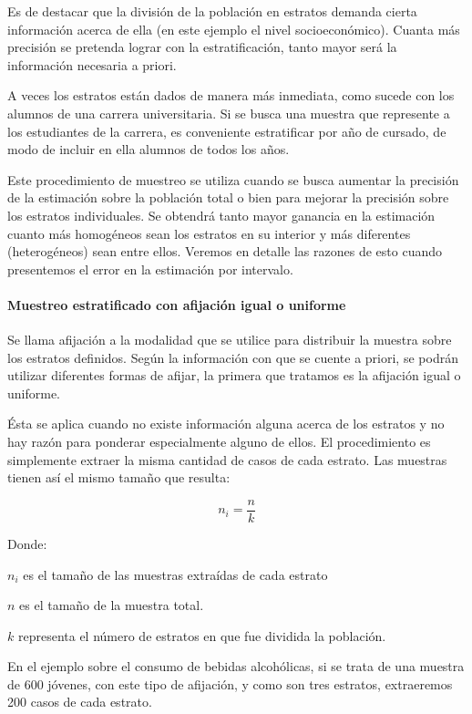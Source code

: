 \documentclass[]{article}
\let\oldparagraph\paragraph
\renewcommand{\paragraph}[1]{\oldparagraph{#1}\mbox{}}
\begin{document}
Es de destacar que la división de la población en estratos demanda
cierta información acerca de ella (en este ejemplo el nivel
socioeconómico). Cuanta más precisión se pretenda lograr con la
estratificación, tanto mayor será la información necesaria a priori.

A veces los estratos están dados de manera más inmediata, como sucede
con los alumnos de una carrera universitaria. Si se busca una muestra
que represente a los estudiantes de la carrera, es conveniente
estratificar por año de cursado, de modo de incluir en ella alumnos de
todos los años.

Este procedimiento de muestreo se utiliza cuando se busca aumentar la
precisión de la estimación sobre la población total o bien para mejorar
la precisión sobre los estratos individuales. Se obtendrá tanto mayor
ganancia en la estimación cuanto más homogéneos sean los estratos en su
interior y más diferentes (heterogéneos) sean entre ellos. Veremos en
detalle las razones de esto cuando presentemos el error en la estimación
por intervalo.

\hypertarget{muestreo-estratificado-con-afijacion-igual-o-uniforme}{%
\paragraph{Muestreo estratificado con afijación igual o uniforme}\label{muestreo-estratificado-con-afijacion-igual-o-uniforme}}

Se llama afijación a la modalidad que se utilice para distribuir la
muestra sobre los estratos definidos. Según la información con que se
cuente a priori, se podrán utilizar diferentes formas de afijar, la
primera que tratamos es la afijación igual o uniforme.

Ésta se aplica cuando no existe información alguna acerca de los
estratos y no hay razón para ponderar especialmente alguno de ellos. El
procedimiento es simplemente extraer la misma cantidad de casos de cada
estrato. Las muestras tienen así el mismo tamaño que resulta:

\[n_{i} = \frac{n}{k}\]

Donde:

\(n_{i}\) es el tamaño de las muestras extraídas de cada estrato

\(n\) es el tamaño de la muestra total.

\(k\) representa el número de estratos en que fue dividida la población.

En el ejemplo sobre el consumo de bebidas alcohólicas, si se trata de
una muestra de 600 jóvenes, con este tipo de afijación, y como son tres
estratos, extraeremos 200 casos de cada estrato.
\end{document}
